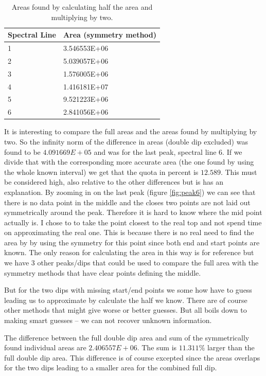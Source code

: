 \documentclass[10pt, a4paper]{article}
\begin{document}
\begin{table}[h]
\begin{center}
\begin{tabular}{l | l}
Spectral Line & Area (symmetry method) \\ \hline
1   & 3.546553E+06 \\
2   & 5.039057E+06 \\
3   & 1.576005E+06 \\
4   & 1.416181E+07 \\
5   & 9.521223E+06 \\
6   & 2.841056E+06
\end{tabular}
\end{center}
\caption{Areas found by calculating half the area and multiplying by two.}
\label{table:halfareas}
\end{table}
 

It is interesting to compare the full areas and the areas found by multiplying by two. So the infinity norm of the difference in areas (double dip excluded) was found to be $ 4.091669E+05$ and was for the last peak, spectral line 6. If we divide that with the corresponding more accurate area (the one found by using the whole known interval) we get that the quota in percent is $12.589$. This must be considered high, also relative to the other differences but is has an explanation. By zooming in on the last peak (figure \ref{fig:peak6}) we can see that there is no data point in the middle and the closes two points are not laid out symmetrically around the peak. Therefore it is hard to know where the mid point actually is. I chose to to take the point closest to the real top and not spend time on approximating the real one. This is because there is no real need to find the area by by using the symmetry for this point since both end and start points are known. The only reason for calculating the area in this way is for reference but we have 3 other peaks/dips that could be used to compare the full area with the symmetry methods that have clear points defining the middle.

But for the two dips with missing start/end points we some how have to guess leading us to approximate by calculate the half we know. There are of course other methods that might give worse or better guesses. But all boils down to making smart guesses -- we can not recover unknown information.

The difference between the full double dip area and sum of the symmetrically found individual areas are $2.406557E+06$. The sum is $11.311\%$ larger than the full double dip area. This difference is of course excepted since the areas overlaps for the two dips leading to a smaller area for the combined full dip.
\end{document}
